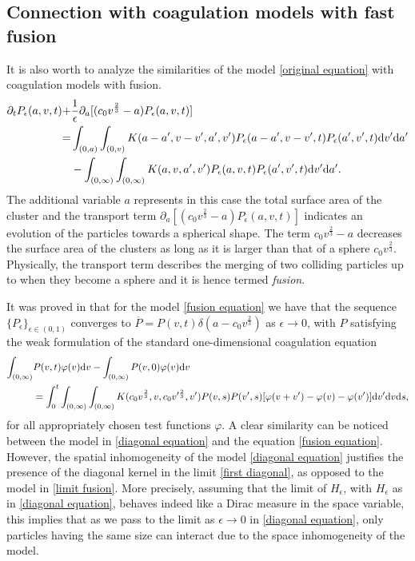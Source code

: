 \documentclass[11pt]{article}
\numberwithin{equation}{section}
\newcommand{\der}{\textup{d}}
\begin{document}
\subsection{Connection with coagulation models with fast fusion}\label{fast fusion subsection}
It is also worth to analyze the similarities of the model \eqref{original equation} with coagulation models with fusion.
\begin{align}
\partial_{t}P_{\epsilon}(a, v, t) +&\frac{1}{\epsilon}
\partial_{a}[(c_{0}v^{\frac{2}{3}} - a)P_{\epsilon}(a, v, t)] \nonumber\\
= & \int_{(0,a)} \int_{(0,v)}
K(a-a' , v-v', a' , v')P_{\epsilon}(a-a',v-v', t)P_{\epsilon}(a', v',t)\der v'
\der a' \nonumber\\
&- \int_{(0,\infty)} \int_{(0,\infty)}
K(a , v, a' , v')P_{\epsilon}(a,v, t)P_{\epsilon}(a', v',t)\der v'
\der a'.  \label{fusion equation}
\end{align}
The additional variable $a$ represents in this case the total surface area of the cluster and the transport term $\partial_{a}[(c_{0}v^{\frac{2}{3}} - a)P_{\epsilon}(a, v, t)]$  indicates an evolution of the particles towards a spherical shape. The term $c_{0}v^{\frac{2}{3}} - a$  decreases the surface area of the clusters as long as it is larger than that of a sphere $c_{0}v^{\frac{2}{3}}$. Physically, the transport term describes the merging of two colliding particles up to when they become a sphere and it is hence termed \textit{fusion}.

It was proved in \cite{cristian2023fast} that for the model \eqref{fusion equation} we have  that the sequence $\{P_{\epsilon}\}_{\epsilon\in(0,1)}$ converges to $\overline{P} = P(v, t)\delta(a -c_{0}v^{\frac{2}{3}} )$ as $\epsilon\rightarrow 0$,
with $P$ satisfying the weak formulation of the standard one-dimensional coagulation equation
\begin{align}\label{limit fusion}
\int_{(0,\infty)}& P(v, t)\varphi (v)\der v - \int_{(0,\infty)} P(v, 0)\varphi (v)\der v\\
&=
\int_{0}^{t} \int_{(0,\infty)} \int_{(0,\infty)}
K(c_{0}v^{\frac{2}{3}} , v, c_{0}v'^{\frac{2}{3}} , v')P(v, s)P(v',s)[\varphi(v + v') - \varphi(v) - \varphi(v')]\der v'
\der v \der s, \nonumber
\end{align}
for all appropriately chosen test functions $\varphi$.
A clear similarity can be noticed between the model in \eqref{diagonal equation} and the equation \eqref{fusion equation}. However, the spatial inhomogeneity of the model \eqref{diagonal equation} justifies the presence of the diagonal kernel in the limit \eqref{first diagonal}, as opposed to the model in \eqref{limit fusion}. More precisely,
assuming that the limit of $H_{\epsilon}$, with $H_{\epsilon}$ as in \eqref{diagonal equation}, behaves indeed like a Dirac measure in the space variable, this implies that as we pass to the limit as $\epsilon\rightarrow 0$ in \eqref{diagonal equation}, only particles having the same size can interact due to the space inhomogeneity of the model.
\end{document}
